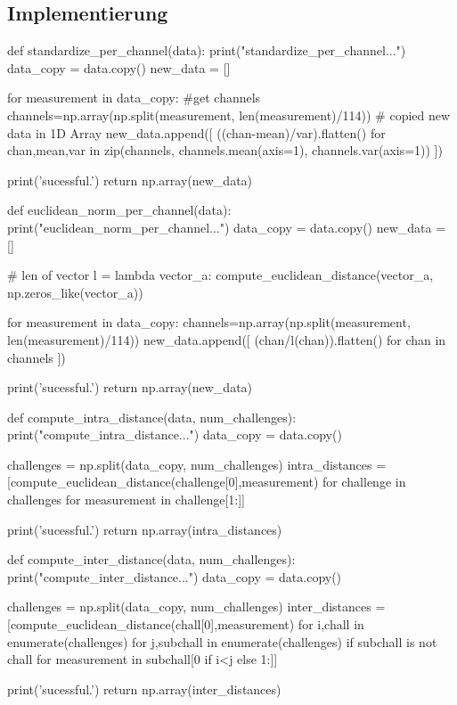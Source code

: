 \subsection{Implementierung}

\begin{python}
def standardize_per_channel(data):
	print("standardize_per_channel...")
	data_copy = data.copy()
	new_data = []
	
	for measurement in data_copy: 
		#get channels
		channels=np.array(np.split(measurement, len(measurement)/114)) 
		# copied new data in 1D Array
		new_data.append([ ((chan-mean)/var).flatten() for chan,mean,var in zip(channels, channels.mean(axis=1), channels.var(axis=1)) ])
    
	print('sucessful.')
	return np.array(new_data)
\end{python}

\hfill \break
\hfill \break

\begin{python}

def euclidean_norm_per_channel(data):
	print("euclidean_norm_per_channel...")
	data_copy = data.copy()
	new_data = []
	
	# len of vector
	l = lambda vector_a: compute_euclidean_distance(vector_a, np.zeros_like(vector_a))
	
	for measurement in data_copy: 
		channels=np.array(np.split(measurement, len(measurement)/114))
		new_data.append([ (chan/l(chan)).flatten() for chan in channels ])


	print('sucessful.')
	return np.array(new_data)
\end{python}
\newpage
\begin{python}    
def compute_intra_distance(data, num_challenges):
	print("compute_intra_distance...")
	data_copy = data.copy()

	challenges = np.split(data_copy, num_challenges)
	intra_distances = [compute_euclidean_distance(challenge[0],measurement) 
                       for challenge in challenges
                       for measurement in challenge[1:]]
    
	print('sucessful.')
	return np.array(intra_distances)
\end{python}

\hfill \break
\hfill \break

\begin{python}
def compute_inter_distance(data, num_challenges):
	print("compute_inter_distance...")
	data_copy = data.copy()

	challenges = np.split(data_copy, num_challenges)
	inter_distances = [compute_euclidean_distance(chall[0],measurement)
                       for i,chall in enumerate(challenges)
                       for j,subchall in enumerate(challenges)
                       if subchall is not chall
                       for measurement in subchall[0 if i<j else 1:]]

	print('sucessful.')
	return np.array(inter_distances)
\end{python}